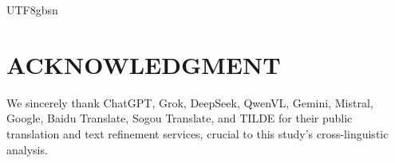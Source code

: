 \documentclass[conference]{IEEEtran}
\begin{document}
\begin{CJK*}{UTF8}{gbsn}








\section*{ACKNOWLEDGMENT}
We sincerely thank ChatGPT, Grok, DeepSeek, QwenVL, Gemini, Mistral, Google, Baidu Translate, Sogou Translate, and TILDE for their public translation and text refinement services, crucial to this study’s cross-linguistic analysis.



\end{CJK*}
\end{document}
